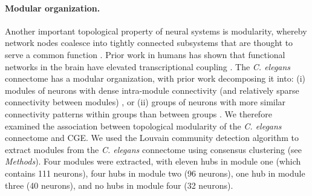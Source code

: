 \documentclass[10pt,letterpaper]{article}
\begin{document}
{\paragraph{Modular organization.}
Another important topological property of neural systems is modularity, whereby network nodes coalesce into tightly connected subsystems that are thought to serve a common function \cite{Sporns2016}.
Prior work in humans has shown that functional networks in the brain have elevated transcriptional coupling \cite{Richiardi2015}.
The \emph{C. elegans} connectome has a modular organization, with prior work decomposing it into:
(i) modules of neurons with dense intra-module connectivity (and relatively sparse connectivity between modules) \cite{Kim:2014bu, Pan:2010jt, Bassett2010}, or
(ii) groups of neurons with more similar connectivity patterns within groups than between groups \cite{Achacoso:1992ay, Pavlovic:2014gx}.
We therefore examined the association between topological modularity of the \emph{C. elegans} connectome and CGE.
We used the Louvain community detection algorithm \cite{Blondel:2008do} to extract modules from the \emph{C. elegans} connectome using consensus clustering (see \textit{Methods}).
Four modules were extracted, with eleven hubs in module one (which contains 111 neurons), four hubs in module two (96 neurons), one hub in module three (40 neurons), and no hubs in module four (32 neurons).
}
\end{document}
